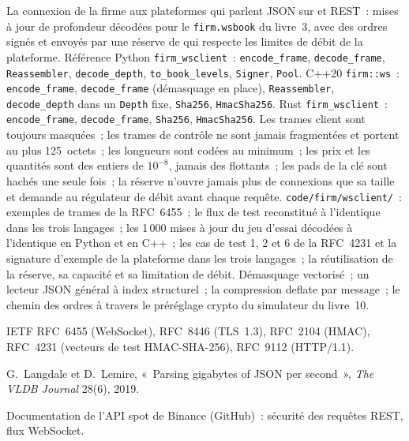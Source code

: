 \begin{build}
 La connexion de la firme aux plateformes qui parlent JSON sur  et REST~: mises à jour de profondeur décodées pour le
\texttt{firm.wsbook} du livre~3, avec des ordres signés et envoyés par une réserve de  qui respecte les limites de débit de la plateforme.
 Référence Python \texttt{firm\_wsclient}~: \texttt{encode\_frame}, \texttt{decode\_frame},
\texttt{Reassembler}, \texttt{decode\_depth}, \texttt{to\_book\_levels}, \texttt{Signer}, \texttt{Pool}. C++20
\texttt{firm::ws}~: \texttt{encode\_frame}, \texttt{decode\_frame} (démasquage en place), \texttt{Reassembler},
\texttt{decode\_depth} dans un \texttt{Depth} fixe, \texttt{Sha256}, \texttt{HmacSha256}. Rust \texttt{firm\_wsclient}~:
\texttt{encode\_frame}, \texttt{decode\_frame}, \texttt{Sha256}, \texttt{HmacSha256}.
 Les trames client sont toujours masquées~; les trames de contrôle ne sont jamais fragmentées et portent au plus 125~octets~; les longueurs sont
codées au minimum~; les prix et les quantités sont des entiers de $10^{-8}$, jamais des flottants~; les pads de la clé sont hachés une seule fois~; la réserve
n'ouvre jamais plus de connexions que sa taille et demande au régulateur de débit avant chaque requête.
 \texttt{code/firm/wsclient/}~: exemples de trames de la RFC~6455~; le flux de test reconstitué à l'identique
dans les trois langages~; les 1\,000 mises à jour du jeu d'essai décodées à l'identique en Python et en C++~; les cas de test 1, 2 et 6 de la RFC~4231 et
la signature d'exemple de la plateforme dans les trois langages~; la réutilisation de la réserve, sa capacité et sa limitation de débit.
 Démasquage vectorisé~; un lecteur JSON général à index structurel~; la compression deflate par message~; le chemin des ordres à travers
le préréglage crypto du simulateur du livre~10.
\end{build}

\begin{omsources}
\item IETF RFC~6455 (WebSocket), RFC~8446 (TLS~1.3), RFC~2104 (HMAC), RFC~4231 (vecteurs de test HMAC-SHA-256), RFC~9112
(HTTP/1.1).
\item G.~Langdale et D.~Lemire, «~Parsing gigabytes of JSON per second~», \emph{The VLDB Journal} 28(6), 2019.
\item Documentation de l'API spot de Binance (GitHub)~: sécurité des requêtes REST, flux WebSocket.
\end{omsources}

